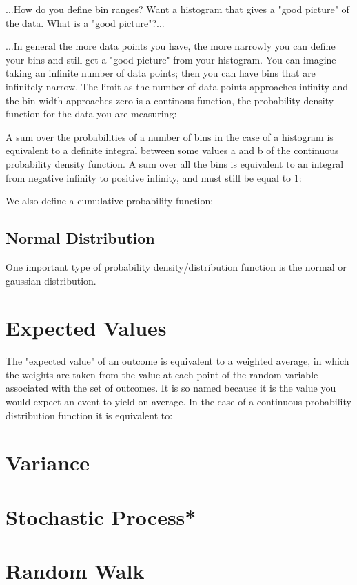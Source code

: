\documentclass{article}
\begin{document}
...How do you define bin ranges? Want a histogram that gives a "good picture" of the data.  What is a "good picture"?...


...In general the more data points you have, the more narrowly you can define your bins and still get a "good picture" from your histogram.  You can imagine taking an infinite number of data points; then you can have bins that are infinitely narrow.  The limit as the number of data points approaches infinity and the bin width approaches zero is a continous function, the probability density function for the data you are measuring: %

A sum over the probabilities of a number of bins in the case of a histogram is equivalent to a definite integral between some values a and b of the continuous probability density function.  A sum over all the bins is equivalent to an integral from negative infinity to positive infinity, and must still be equal to 1: %

We also define a cumulative probability function:  %



\subsection{Normal Distribution}
One important type of probability density/distribution function is the normal or gaussian distribution.  


\section{Expected Values}
The "expected value" of an outcome is equivalent to a weighted average, in which the weights are taken from the value at each point of the random variable associated with the set of outcomes.  It is so named because it is the value you would expect an event to yield on average.  In the case of a continuous probability distribution function it is equivalent to:  %


\section{Variance}


\section{Stochastic Process*}

\section{Random Walk}
\end{document}
